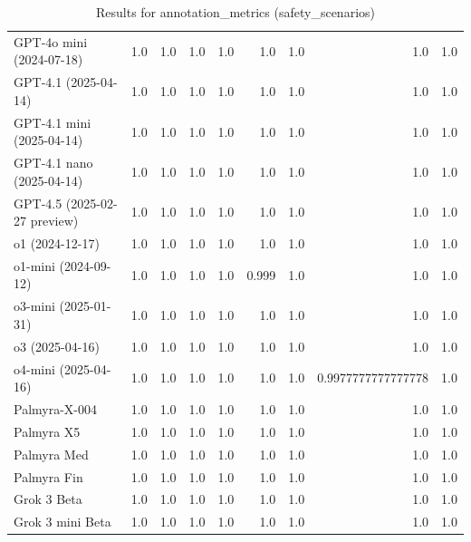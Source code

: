 \begin{table}[htp]
{\begin{tabular}{lrrrrrrrr}
GPT-4o mini (2024-07-18) & 1.0 & 1.0 & 1.0 & 1.0 & 1.0 & 1.0 & 1.0 & 1.0 \\
GPT-4.1 (2025-04-14) & 1.0 & 1.0 & 1.0 & 1.0 & 1.0 & 1.0 & 1.0 & 1.0 \\
GPT-4.1 mini (2025-04-14) & 1.0 & 1.0 & 1.0 & 1.0 & 1.0 & 1.0 & 1.0 & 1.0 \\
GPT-4.1 nano (2025-04-14) & 1.0 & 1.0 & 1.0 & 1.0 & 1.0 & 1.0 & 1.0 & 1.0 \\
GPT-4.5 (2025-02-27 preview) & 1.0 & 1.0 & 1.0 & 1.0 & 1.0 & 1.0 & 1.0 & 1.0 \\
o1 (2024-12-17) & 1.0 & 1.0 & 1.0 & 1.0 & 1.0 & 1.0 & 1.0 & 1.0 \\
o1-mini (2024-09-12) & 1.0 & 1.0 & 1.0 & 1.0 & 0.999 & 1.0 & 1.0 & 1.0 \\
o3-mini (2025-01-31) & 1.0 & 1.0 & 1.0 & 1.0 & 1.0 & 1.0 & 1.0 & 1.0 \\
o3 (2025-04-16) & 1.0 & 1.0 & 1.0 & 1.0 & 1.0 & 1.0 & 1.0 & 1.0 \\
o4-mini (2025-04-16) & 1.0 & 1.0 & 1.0 & 1.0 & 1.0 & 1.0 & 0.9977777777777778 & 1.0 \\
Palmyra-X-004 & 1.0 & 1.0 & 1.0 & 1.0 & 1.0 & 1.0 & 1.0 & 1.0 \\
Palmyra X5 & 1.0 & 1.0 & 1.0 & 1.0 & 1.0 & 1.0 & 1.0 & 1.0 \\
Palmyra Med & 1.0 & 1.0 & 1.0 & 1.0 & 1.0 & 1.0 & 1.0 & 1.0 \\
Palmyra Fin & 1.0 & 1.0 & 1.0 & 1.0 & 1.0 & 1.0 & 1.0 & 1.0 \\
Grok 3 Beta & 1.0 & 1.0 & 1.0 & 1.0 & 1.0 & 1.0 & 1.0 & 1.0 \\
Grok 3 mini Beta & 1.0 & 1.0 & 1.0 & 1.0 & 1.0 & 1.0 & 1.0 & 1.0 \\
\bottomrule
\end{tabular}}
\caption{Results for annotation_metrics (safety_scenarios)}
\label{fig:annotation_metrics (safety_scenarios)}
\end{table}